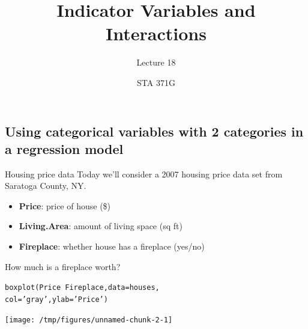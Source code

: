 \documentclass{beamer}\usepackage[]{graphicx}\usepackage[]{color}
\title{Indicator Variables and Interactions}
\subtitle{Lecture 18}
\author{STA 371G}
\makeatletter
\newcommand{\hlstr}[1]{\textcolor[rgb]{1,0.894,0.71}{#1}}%
\newcommand{\hlopt}[1]{\textcolor[rgb]{1,0.894,0.769}{#1}}%
\newcommand{\hlstd}[1]{\textcolor[rgb]{1,0.894,0.769}{#1}}%
\newcommand{\hlkwc}[1]{\textcolor[rgb]{0.78,0.941,0.545}{#1}}%
\newcommand{\hlkwd}[1]{\textcolor[rgb]{1,0.78,0.769}{#1}}%
\newenvironment{kframe}{%
 \def\at@end@of@kframe{}%
 \ifinner\ifhmode%
  \def\at@end@of@kframe{\end{minipage}}%
  \begin{minipage}{\columnwidth}%
 \fi\fi%
 \def\FrameCommand##1{\hskip\@totalleftmargin \hskip-\fboxsep
 \colorbox{shadecolor}{##1}\hskip-\fboxsep
     \hskip-\linewidth \hskip-\@totalleftmargin \hskip\columnwidth}%
 \MakeFramed {\advance\hsize-\width
   \@totalleftmargin\z@ \linewidth\hsize
   \@setminipage}}%
 {\par\unskip\endMakeFramed%
 \at@end@of@kframe}
\newenvironment{knitrout}{}{} %
\makeatother
\begin{document}
  
  

\frame{\maketitle}



  \begin{darkframes}
    \section{Using categorical variables with 2 categories in a regression model}

    \begin{frame}{Housing price data}
      Today we'll consider a 2007 housing price data set from Saratoga County, NY.
      \begin{itemize}
        \item \textbf{Price}: price of house (\$)
        \item \textbf{Living.Area}: amount of living space (sq ft)
        \item \textbf{Fireplace}: whether house has a fireplace (yes/no)
      \end{itemize}

    \end{frame}

    \begin{frame}[fragile]{How much is a fireplace worth?}
\begin{knitrout}
\color{fgcolor}\begin{kframe}
\begin{alltt}
\hlkwd{boxplot}\hlstd{(Price} \hlopt{~} \hlstd{Fireplace,} \hlkwc{data}\hlstd{=houses,}
  \hlkwc{col}\hlstd{=}\hlstr{'gray'}\hlstd{,} \hlkwc{ylab}\hlstd{=}\hlstr{'Price'}\hlstd{)}
\end{alltt}
\end{kframe}
\texttt{[image: /tmp/figures/unnamed-chunk-2-1]} 

\end{knitrout}
    \end{frame}


\end{darkframes}
\end{document}
